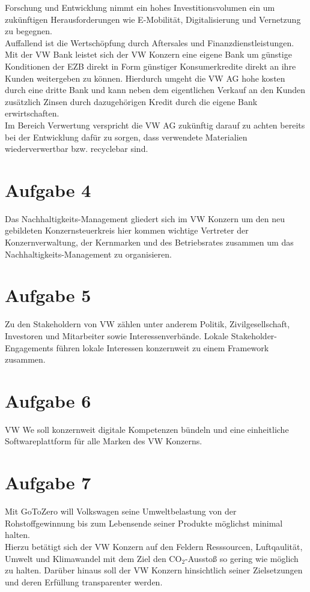 \documentclass{article}
\begin{document}
Forschung und Entwicklung nimmt ein hohes Investitionsvolumen ein um zukünftigen Herausforderungen wie E-Mobilität, Digitalisierung und Vernetzung zu begegnen. \\

Auffallend ist die Wertschöpfung durch Aftersales und Finanzdienstleistungen. Mit der VW Bank leistet sich der VW Konzern eine eigene Bank um günstige Konditionen der EZB direkt in Form günstiger Konsumerkredite direkt an ihre Kunden weitergeben zu können. Hierdurch umgeht die VW AG hohe kosten durch eine dritte Bank und kann neben dem eigentlichen Verkauf an den Kunden zusätzlich Zinsen durch dazugehörigen Kredit durch die eigene Bank erwirtschaften. \\

Im Bereich Verwertung verspricht die VW AG zukünftig darauf zu achten bereits bei der Entwicklung dafür zu sorgen, dass verwendete Materialien wiederverwertbar bzw. recyclebar sind.

\section*{Aufgabe 4}
Das Nachhaltigkeits-Management gliedert sich im VW Konzern um den neu gebildeten Konzernsteuerkreis hier kommen wichtige Vertreter der Konzernverwaltung, der Kernmarken und des Betriebsrates zusammen um das Nachhaltigkeits-Management zu organisieren.

\section*{Aufgabe 5}
Zu den Stakeholdern von VW zählen unter anderem Politik, Zivilgesellschaft, Investoren und Mitarbeiter sowie Interessenverbände. Lokale Stakeholder-Engagements führen lokale Interessen konzernweit zu einem Framework zusammen.

\section*{Aufgabe 6}
VW We soll konzernweit digitale Kompetenzen bündeln und eine einheitliche Softwareplattform für alle Marken des VW Konzerns.

\section*{Aufgabe 7}
Mit GoToZero will Volkswagen seine Umweltbelastung von der Rohstoffgewinnung bis zum Lebensende seiner Produkte möglichst minimal halten. \\
Hierzu betätigt sich der VW Konzern auf den Feldern Resssourcen, Luftqaulität, Umwelt und Klimawandel mit dem Ziel den CO$_{2}$-Ausstoß so gering wie möglich zu halten. Darüber hinaus soll der VW Konzern hinsichtlich seiner Zielsetzungen und deren Erfüllung transparenter werden.
\end{document}
